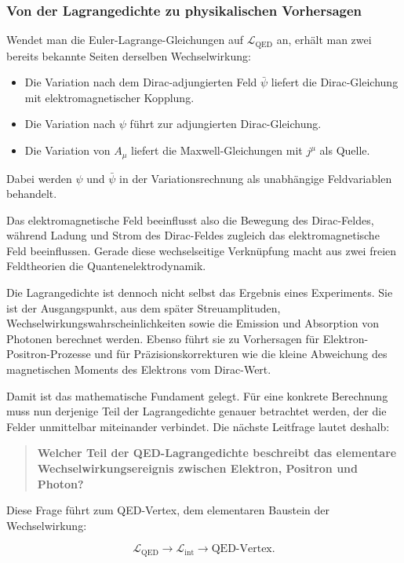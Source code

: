 \subsubsection*{Von der Lagrangedichte zu physikalischen Vorhersagen}

Wendet man die Euler-Lagrange-Gleichungen auf
\(\mathcal L_{\mathrm{QED}}\) an, erhält man zwei bereits bekannte Seiten
derselben Wechselwirkung:

\begin{itemize}
	\item Die Variation nach dem Dirac-adjungierten Feld \(\bar{\psi}\)
	      liefert die Dirac-Gleichung mit elektromagnetischer Kopplung.
	\item Die Variation nach \(\psi\) führt zur adjungierten Dirac-Gleichung.
	\item Die Variation von \(A_\mu\) liefert die Maxwell-Gleichungen mit
	      \(j^\mu\) als Quelle.
\end{itemize}

Dabei werden \(\psi\) und \(\bar{\psi}\) in der Variationsrechnung als
unabhängige Feldvariablen behandelt.

Das elektromagnetische Feld beeinflusst also die Bewegung des
Dirac-Feldes, während Ladung und Strom des Dirac-Feldes zugleich das
elektromagnetische Feld beeinflussen. Gerade diese wechselseitige
Verknüpfung macht aus zwei freien Feldtheorien die Quantenelektrodynamik.

Die Lagrangedichte ist dennoch nicht selbst das Ergebnis eines
Experiments. Sie ist der Ausgangspunkt, aus dem später
Streuamplituden,
Wechselwirkungswahrscheinlichkeiten sowie die Emission und Absorption
von Photonen berechnet werden. Ebenso führt sie zu Vorhersagen für
Elektron-Positron-Prozesse und für Präzisionskorrekturen wie die kleine
Abweichung des magnetischen Moments des Elektrons vom Dirac-Wert.

Damit ist das mathematische Fundament gelegt. Für eine konkrete
Berechnung muss nun derjenige Teil der Lagrangedichte genauer betrachtet
werden, der die Felder unmittelbar miteinander verbindet. Die nächste
Leitfrage lautet deshalb:

\begin{quote}
	\textbf{Welcher Teil der QED-Lagrangedichte beschreibt das elementare
	Wechselwirkungsereignis zwischen Elektron, Positron und Photon?}
\end{quote}

Diese Frage führt zum QED-Vertex, dem elementaren Baustein der
Wechselwirkung:

\begin{equation*}
	\mathcal L_{\mathrm{QED}}
	\longrightarrow
	\mathcal L_{\mathrm{int}}
	\longrightarrow
	\text{QED-Vertex}.
\end{equation*}
